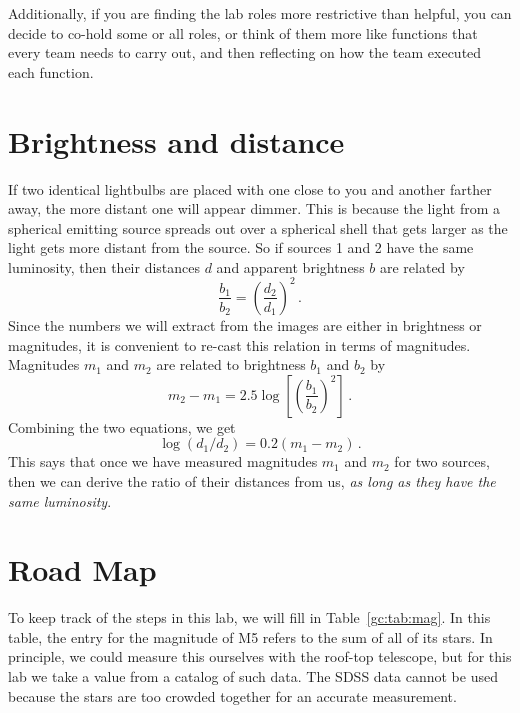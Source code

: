 Additionally, if you are finding the lab roles more restrictive than helpful, you can decide to co-hold some or all roles, or think of them more like functions that every team needs to carry out, and then reflecting on how the team executed each function.

\section{Brightness and distance}

If two identical lightbulbs are placed with one close to you and another farther away, the more distant one will appear dimmer. This is because the light from a spherical emitting source spreads out over a spherical shell that gets larger as the light gets more distant from the source. So if sources 1 and 2 have the same luminosity, then their distances $d$ and apparent brightness
$b$ are related by
\begin{equation}
\frac{b_1}{b_2} = \left( \frac{d_2}{d_1} \right)^2 \,.
\end{equation}
Since the numbers we will extract from the images are either in brightness or magnitudes,
it is convenient to re-cast this relation in terms of magnitudes. Magnitudes $m_1$ and $m_2$ are
related to brightness $b_1$ and $b_2$ by
\begin{equation}
m_2 - m_1 = 2.5 \log \left[ \left( \frac{b_1}{b_2} \right)^2 \right] \,.
\end{equation}
Combining the two equations, we get
\begin{equation}\label{gc:eq:m-d}
 \log(d_1/d_2) = 0.2 (m_1-m_2) \,.
\end{equation}
This says that once we have measured magnitudes $m_1$ and $m_2$ for two sources, then we can
derive the ratio of their distances from us, \textit{as long as they have the same luminosity}.

\section{Road Map}

To keep track of the steps in this lab, we will fill in Table~\ref{gc:tab:mag}. In this table, the entry for the magnitude of M5 refers to the sum of all of its stars. In
principle, we could measure this ourselves with the roof-top telescope, but for this lab we take
a value from a catalog of such data. The SDSS data cannot be used because the stars
are too crowded together for an accurate measurement.

